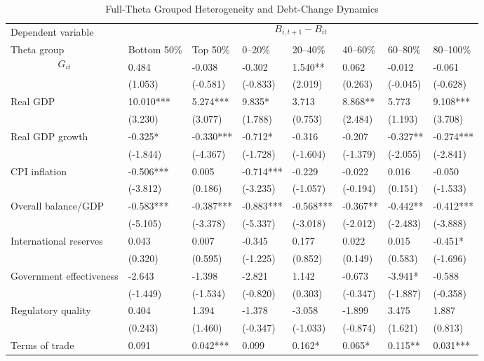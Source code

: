 \begin{table}[H]\centering
\begin{threeparttable}
\caption{Full-Theta Grouped Heterogeneity and Debt-Change Dynamics}
\label{tab:theta_group_heterogeneity_debt}
\scriptsize
\begin{tabularx}{\textwidth}{lYYYYYYY}
\toprule
Dependent variable &  \\
\cmidrule(lr){2-8}
Theta group & Bottom 50\% & Top 50\% & 0--20\% & 20--40\% & 40--60\% & 60--80\% & 80--100\% \\
\midrule
$$G_{it}$$ & 0.484 & -0.038 & -0.302 & 1.540** & 0.062 & -0.012 & -0.061 \\
  & (1.053) & (-0.581) & (-0.833) & (2.019) & (0.263) & (-0.045) & (-0.628) \\
Real GDP & 10.010*** & 5.274*** & 9.835* & 3.713 & 8.868** & 5.773 & 9.108*** \\
  & (3.230) & (3.077) & (1.788) & (0.753) & (2.484) & (1.193) & (3.708) \\
Real GDP growth & -0.325* & -0.330*** & -0.712* & -0.316 & -0.207 & -0.327** & -0.274*** \\
  & (-1.844) & (-4.367) & (-1.728) & (-1.604) & (-1.379) & (-2.055) & (-2.841) \\
CPI inflation & -0.506*** & 0.005 & -0.714*** & -0.229 & -0.022 & 0.016 & -0.050 \\
  & (-3.812) & (0.186) & (-3.235) & (-1.057) & (-0.194) & (0.151) & (-1.533) \\
Overall balance/GDP & -0.583*** & -0.387*** & -0.883*** & -0.568*** & -0.367** & -0.442** & -0.412*** \\
  & (-5.105) & (-3.378) & (-5.337) & (-3.018) & (-2.012) & (-2.483) & (-3.888) \\
International reserves & 0.043 & 0.007 & -0.345 & 0.177 & 0.022 & 0.015 & -0.451* \\
  & (0.320) & (0.595) & (-1.225) & (0.852) & (0.149) & (0.583) & (-1.696) \\
Government effectiveness & -2.643 & -1.398 & -2.821 & 1.142 & -0.673 & -3.941* & -0.588 \\
  & (-1.449) & (-1.534) & (-0.820) & (0.303) & (-0.347) & (-1.887) & (-0.358) \\
Regulatory quality & 0.404 & 1.394 & -1.378 & -3.058 & -1.899 & 3.475 & 1.887 \\
  & (0.243) & (1.460) & (-0.347) & (-1.033) & (-0.874) & (1.621) & (0.813) \\
Terms of trade & 0.091 & 0.042*** & 0.099 & 0.162* & 0.065* & 0.115** & 0.031*** \\

\end{tabularx}
\end{threeparttable}
\end{table}
